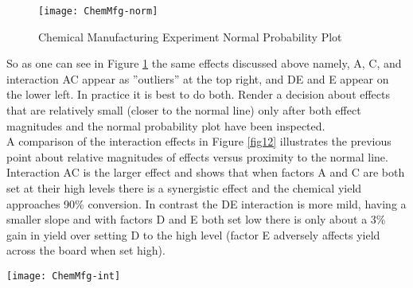 \begin{figure}[h]\caption{Chemical Manufacturing Experiment Normal Probability Plot}\label{fig11}
\begin{center}
\texttt{[image: ChemMfg-norm]}
\end{center}
\end{figure}

So as one can see in Figure \ref{fig11} the same effects discussed above namely, A, C, and interaction AC appear as ''outliers'' at the top right, and DE and E appear on the lower left.  In practice it is best to do both. Render a decision about effects that are relatively small (closer to the normal line) only after both effect magnitudes and the normal probability plot have been inspected.\\


A comparison of the interaction effects in Figure \ref{fig12} illustrates the previous point about relative magnitudes of effects versus proximity to the normal line.  Interaction AC is the larger effect and shows that when factors A and C are both set at their high levels there is a synergistic effect and the chemical yield approaches 90\% conversion.  In contrast the DE interaction is more mild, having a smaller slope and with factors D and E both set low there is only about a 3\% gain in yield over setting D to the high level (factor E adversely affects yield across the board when set high).

\begin{sidewaysfigure}[h]\caption{Chemical Manufacturing Experiment Interaction Plots}\label{fig12}
\begin{center}
\texttt{[image: ChemMfg-int]}
\end{center}
\end{sidewaysfigure}



